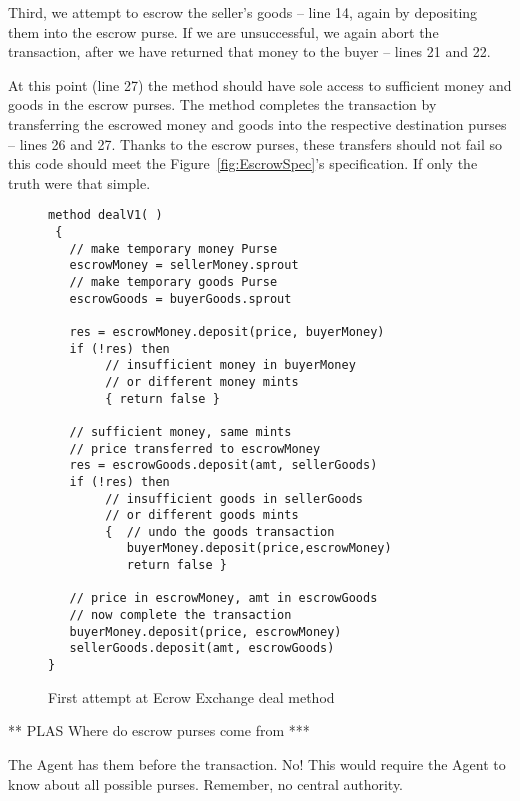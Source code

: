 Third, we   attempt to escrow the seller's goods -- line 14, again
by depositing them into the escrow purse.  If we are unsuccessful, we
again abort the transaction,
after we have returned that money to the buyer -- lines 21 and 22.

At this point (line 27) the  method should have sole
access to sufficient money and goods in the escrow purses.  The method
completes the transaction by transferring the escrowed money and goods
into the respective destination purses %
-- lines 26 and 27. Thanks to the escrow purses, these transfers should not
fail so this code should meet the Figure~\ref{fig:EscrowSpec}'s
specification.  If only the truth were that simple.

\begin{figure}
\begin{lstlisting}
method dealV1( )
 {
   // make temporary money Purse
   escrowMoney = sellerMoney.sprout
   // make temporary goods Purse
   escrowGoods = buyerGoods.sprout

   res = escrowMoney.deposit(price, buyerMoney)
   if (!res) then
        // insufficient money in buyerMoney
        // or different money mints
        { return false }

   // sufficient money, same mints
   // price transferred to escrowMoney
   res = escrowGoods.deposit(amt, sellerGoods)
   if (!res) then
        // insufficient goods in sellerGoods
        // or different goods mints
        {  // undo the goods transaction
           buyerMoney.deposit(price,escrowMoney)
           return false }

   // price in escrowMoney, amt in escrowGoods
   // now complete the transaction
   buyerMoney.deposit(price, escrowMoney)
   sellerGoods.deposit(amt, escrowGoods)
}
\end{lstlisting}
\vspace*{-7mm}
\caption{First attempt at Ecrow Exchange deal method}
\label{fig:DealV1}
\end{figure}




** PLAS Where do escrow purses come from ***

The Agent has them before the transaction.  No! This would require the
Agent to know about all possible purses. Remember, no central
authority.

